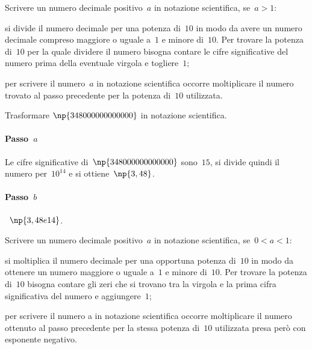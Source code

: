\begin{procedura}
Scrivere un numero decimale positivo~$a$ in notazione scientifica, se~$a>1$:
\begin{enumeratea}
 \item si divide il numero decimale per una potenza di~$10$ in modo da avere un numero decimale compreso maggiore o uguale a~$1$ e minore di~$10$. Per trovare la potenza di~$10$ per la quale dividere il numero bisogna contare le cifre significative
del numero prima della eventuale virgola e togliere~$1$;
 \item per scrivere il numero~$a$ in notazione scientifica occorre moltiplicare il numero trovato al passo
precedente per la potenza di~$10$ utilizzata.
\end{enumeratea}
\end{procedura}

\begin{exrig}
 \begin{esempio}
Trasformare $\np{348000000000000}$ in notazione scientifica.
\paragraph{Passo~$a$} Le cifre significative di~$\np{348000000000000}$ sono~$15$,
si divide quindi il numero per~$10^{14}$ e si ottiene~$\np{3,48}$.
\paragraph{Passo~$b$}~$\np{3,48e14}$.
 \end{esempio}
\end{exrig}

\begin{procedura}
Scrivere un numero decimale positivo~$a$ in notazione scientifica, se~$0<a<1$:
\begin{enumeratea}
 \item si moltiplica il numero decimale per una opportuna potenza di~$10$ in modo da ottenere un numero maggiore o uguale a~$1$ e minore di~$10$. Per trovare la potenza di~$10$ bisogna contare gli zeri che si trovano tra la virgola e la prima cifra
significativa del numero e aggiungere~$1$;
 \item per scrivere il numero a in notazione scientifica occorre moltiplicare il numero ottenuto al passo
precedente per la stessa
potenza di~$10$ utilizzata presa però con esponente negativo.
\end{enumeratea}
\end{procedura}

